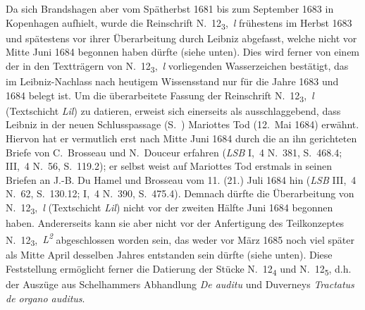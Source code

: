 Da sich Brandshagen\protect{} aber vom Spätherbst 1681 bis zum September 1683 in Kopenhagen aufhielt, %
wurde die Reinschrift N.~12\textsubscript{3},~\textit{l} frühestens im Herbst 1683 und spätestens vor ihrer Überarbeitung durch Leibniz abgefasst, %
welche nicht vor Mitte Juni 1684 begonnen haben dürfte (siehe unten).
Dies wird ferner von einem der in den Textträgern von N.~12\textsubscript{3},~\textit{l} vorliegenden Wasserzeichen bestätigt, das im Leibniz-Nachlass nach heutigem Wissensstand nur für die Jahre 1683 und 1684 belegt ist.
\pend
\pstart%
Um
die überarbeitete Fassung der Reinschrift N.~12\textsubscript{3},~\textit{l} (Textschicht \textit{Lil}) zu datieren, erweist sich einerseits als ausschlaggebend, dass Leibniz in der neuen Schlusspassage (S.~) Mariottes\protect{} Tod (12.~Mai 1684) erwähnt.
Hiervon hat er vermutlich erst nach Mitte Juni 1684 durch die an ihn gerichteten Briefe von C.~Brosseau\protect{} und N.~Douceur\protect{} erfahren (\textit{LSB} \cite{01245}I,~4 N.~381, S.~468.4; \cite{01246}III,~4 N.~56, S.~119.2);
er selbst weist auf Mariottes Tod erstmals in seinen Briefen an J.-B. Du Hamel\protect{} und Brosseau vom 11. (21.) Juli 1684 hin (\textit{LSB} \cite{01282}III,~4 N.~62, S.~130.12; \cite{01283}I,~4 N.~390, S.~475.4).
Demnach dürfte die Überarbeitung von N.~12\textsubscript{3},~\textit{l} (Textschicht \textit{Lil}) 
nicht vor der zweiten Hälfte Juni 1684 begonnen haben.%
Andererseits kann sie aber nicht vor der Anfertigung des Teilkonzeptes N.~12\textsubscript{3},~\textit{L\textsuperscript{2}} abgeschlossen worden sein, das weder vor März 1685 noch viel später als Mitte April desselben Jahres entstanden sein dürfte (siehe unten).
\pend
\newpage
\pstart
Diese Feststellung ermöglicht ferner die Datierung der Stücke N.~12\textsubscript{4} und N.~12\textsubscript{5}, d.h. der Aus\-züge aus Schelhammers\protect{} Abhand\-lung \textit{De auditu}\cite{01204} und Duverneys\protect{} \textit{Tractatus de organo auditus}.\cite{01203}
